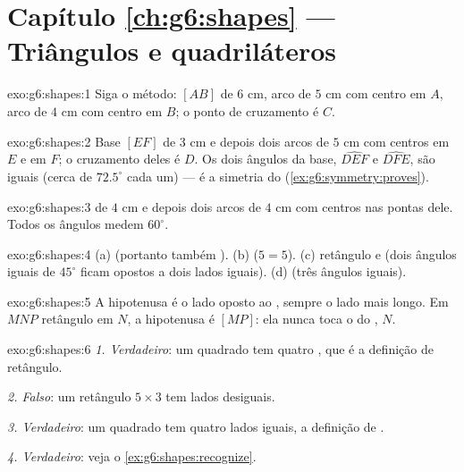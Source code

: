 \section*{Capítulo \ref{ch:g6:shapes} --- Triângulos e quadriláteros}

\begin{solution}{exo:g6:shapes:1}
Siga o método:  $[AB]$ de $6$ cm, arco de  $5$ cm com
centro em $A$, arco de  $4$ cm com centro em $B$; o ponto de
cruzamento é $C$.
\end{solution}

\begin{solution}{exo:g6:shapes:2}
Base $[EF]$ de $3$ cm e depois dois arcos de  $5$ cm com centros em
$E$ e em $F$; o cruzamento deles é $D$. Os dois ângulos da base,
$\widehat{DEF}$ e $\widehat{DFE}$, são iguais (cerca de $72.5^\circ$
cada um) --- é a simetria do 
(\cref{ex:g6:symmetry:proves}).
\end{solution}

\begin{solution}{exo:g6:shapes:3}
 de $4$ cm e depois dois arcos de  $4$ cm com centros nas
pontas dele. Todos os ângulos medem $60^\circ$.
\end{solution}

\begin{solution}{exo:g6:shapes:4}
(a)  (portanto também ). \quad
(b)  ($5 = 5$). \quad
(c) retângulo e  (dois ângulos iguais de $45^\circ$ ficam
opostos a dois lados iguais). \quad
(d)  (três ângulos iguais).
\end{solution}

\begin{solution}{exo:g6:shapes:5}
A hipotenusa é o lado oposto ao , sempre o lado mais longo.
Em $MNP$ retângulo em $N$, a hipotenusa é $[MP]$: ela nunca toca o
 do , $N$.
\end{solution}

\begin{solution}{exo:g6:shapes:6}
\emph{1. Verdadeiro}: um quadrado tem quatro , que é a
definição de retângulo.

\emph{2. Falso}: um retângulo $5 \times 3$ tem lados desiguais.

\emph{3. Verdadeiro}: um quadrado tem quatro lados iguais, a definição
de .

\emph{4. Verdadeiro}: veja o \cref{ex:g6:shapes:recognize}.
\end{solution}

